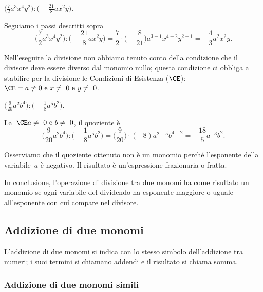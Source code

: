 \begin{exrig}
 \begin{esempio}
$\bigg(\frac{7}{2}a^{3}x^{4}y^{2}\bigg):\bigg(-{\frac{21}{8}}ax^{2}y\bigg)$.

Seguiamo i passi descritti sopra
\[\bigg(\frac{7}{2}a^{3}x^{4}y^{2}\bigg):\bigg(-{\frac{21}{8}}ax^{2}y\bigg)=\frac{7}{2}\cdot%
\bigg(-{\frac{8}{21}}\bigg)a^{3-1}x^{4-2}y^{2-1}=-{\frac{4}{3}}a^{2}x^{2}y.\]

Nell'eseguire la divisione non abbiamo tenuto conto
della condizione che il divisore deve essere diverso dal monomio nullo;
questa condizione ci obbliga a stabilire per la divisione le Condizioni
di Esistenza ($\CE$):~$\CE=a\neq0\text{ e }x\neq~0\text{ e }y\neq~0$.
 \end{esempio}

 \begin{esempio}
$\bigg(\frac{9}{20}a^{2}b^{4}\bigg):\bigg(-{\frac{1}{8}}a^{5}b^{2}\bigg)$.

La~$\CE a\neq~0\text{ e }b\neq~0$, il quoziente è
\[\bigg(\frac{9}{20}a^{2}b^{4}\bigg):\bigg(-{\frac{1}{8}}a^{5}b^{2}\bigg)=%
\bigg(\frac{9}{20}\bigg)\cdot(-8)a^{2-5}b^{4-2}=-{\frac{18}{5}}a^{-3}b^{2}.\]

Osserviamo che il quoziente ottenuto non è un monomio perché
l'esponente della variabile~$a$ è negativo. Il
risultato è un'espressione frazionaria o fratta.
 \end{esempio}
\end{exrig}

In conclusione, l'operazione di divisione tra due monomi
ha come risultato un monomio se ogni variabile del dividendo ha
esponente maggiore o uguale all'esponente con cui
compare nel divisore.



\subsection{Addizione di due monomi}
\label{subsec:09_monomi_somma}

L'addizione di due monomi si indica con lo stesso
simbolo dell'addizione tra numeri; i suoi termini si
chiamano addendi e il risultato si chiama somma.

\subsubsection{Addizione di due monomi simili}


